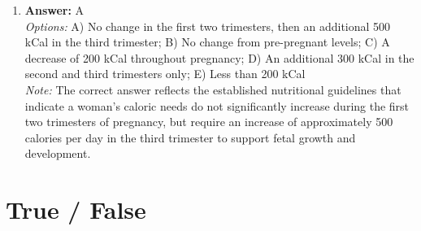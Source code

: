 \documentclass[12pt]{article}
\begin{document}
\begin{enumerate}[label=\arabic*.]
\item \textbf{Answer:} A
\\ \textit{Options:} A) No change in the first two trimesters, then an additional 500 kCal in the third trimester; B) No change from pre-pregnant levels; C) A decrease of 200 kCal throughout pregnancy; D) An additional 300 kCal in the second and third trimesters only; E) Less than 200 kCal
\\ \textit{Note:} The correct answer reflects the established nutritional guidelines that indicate a woman's caloric needs do not significantly increase during the first two trimesters of pregnancy, but require an increase of approximately 500 calories per day in the third trimester to support fetal growth and development.
\end{enumerate}

\section*{True / False}
\end{document}
